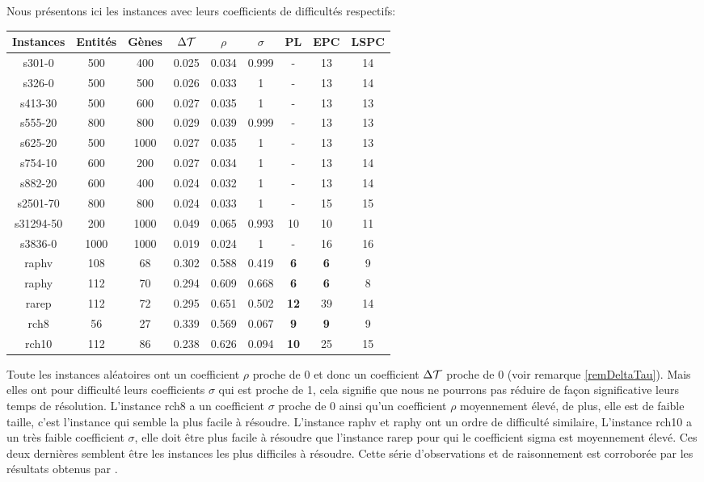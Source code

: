 Nous présentons ici les instances avec leurs coefficients de difficultés respectifs:
\begin{center}
\begin{tabular}{|c|c|c|c|c|c|c|c|c|}
\hline 
Instances & Entités & Gènes & $\Delta\cal{T}$ & $\rho$ & $\sigma$ & PL & EPC & LSPC \\ 
\hline 
s301-0 & 500 & 400 & 0.025 & 0.034 & 0.999 & - & 13 & 14 \\ 
\hline 
s326-0 & 500 & 500 & 0.026 & 0.033 & 1 & - & 13 & 14 \\ 
\hline 
s413-30 & 500 & 600 & 0.027 & 0.035 & 1 & - & 13 & 13 \\ 
\hline 
s555-20 & 800 & 800 & 0.029 & 0.039 & 0.999 & - & 13 & 13 \\ 
\hline 
s625-20 & 500 & 1000 & 0.027 & 0.035 & 1 & - & 13 & 13 \\ 
\hline 
s754-10 & 600 & 200 & 0.027 & 0.034 & 1 & - & 13 & 14 \\ 
\hline 
s882-20 & 600 & 400 & 0.024 & 0.032 & 1 & - & 13 & 14 \\ 
\hline 
s2501-70 & 800 & 800 & 0.024 & 0.033 & 1 & - & 15 & 15 \\ 
\hline 
s31294-50 & 200 & 1000 & 0.049 & 0.065 & 0.993 & 10 & 10 & 11 \\ 
\hline 
s3836-0 & 1000 & 1000 & 0.019 & 0.024 & 1 & - & 16 & 16 \\ 
\hline 
raphv & 108 & 68 & 0.302 & 0.588 & 0.419 & \textbf{6} & \textbf{6} & 9 \\ 
\hline 
raphy & 112 & 70 & 0.294 & 0.609 & 0.668 & \textbf{6} & \textbf{6} & 8 \\ 
\hline 
rarep & 112 & 72 & 0.295 & 0.651 & 0.502 & \textbf{12} & 39 & 14 \\ 
\hline 
rch8 & 56 & 27 & 0.339 & 0.569 & 0.067 & \textbf{9} & \textbf{9} & 9 \\ 
\hline 
rch10 & 112 & 86 & 0.238 & 0.626 & 0.094 & \textbf{10} & 25 & 15 \\ 
\hline 
\end{tabular} 
\end{center}

Toute les instances aléatoires ont un coefficient $\rho$ proche de 0 et donc un coefficient $\Delta\cal{T}$ proche de 0 (voir remarque \ref{remDeltaTau}). Mais elles ont pour difficulté leurs coefficients $\sigma$ qui est proche de 1, cela signifie que nous ne pourrons pas réduire de façon significative leurs temps de résolution. L'instance rch8 a un coefficient $\sigma$ proche de 0 ainsi qu'un coefficient $\rho$ moyennement élevé, de plus, elle est de faible taille, c'est l'instance qui semble la plus facile à résoudre. L'instance raphv et raphy ont un ordre de difficulté similaire,  L'instance rch10 a un très faible coefficient $\sigma$, elle doit être plus facile à résoudre que l'instance rarep pour qui le coefficient sigma est moyennement élevé. Ces deux dernières semblent être les instances les plus difficiles à résoudre. Cette série d'observations et de raisonnement est corroborée par les résultats obtenus par \cite{Chhel2013}.

